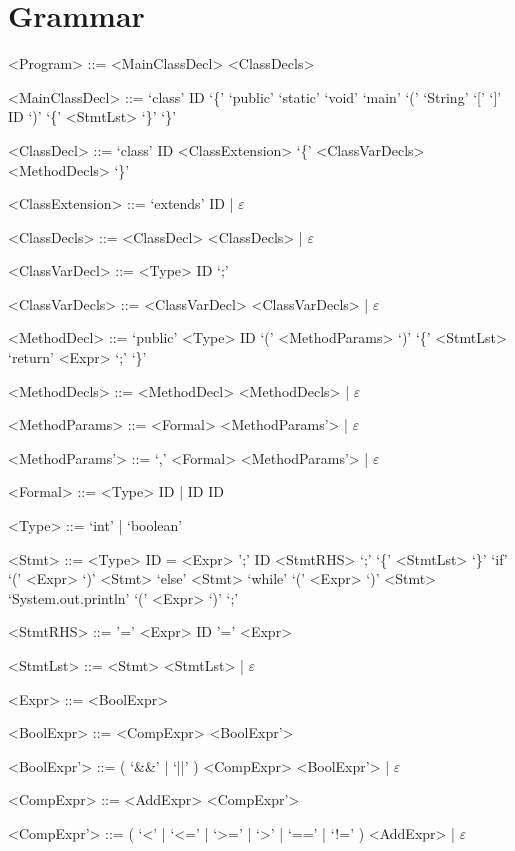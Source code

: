 \documentclass{report}
\begin{document}
\setlength{\grammarparsep}{4pt} %
\setlength{\grammarindent}{12em} %

\section*{Grammar}
\begin{grammar}

<Program> ::= <MainClassDecl> <ClassDecls>

<MainClassDecl> ::= `class' ID `\{' `public' `static' `void' `main' `(' `String' `[' `]' ID `)' `\{' <StmtLst> `\}' `\}'

<ClassDecl> ::= `class' ID <ClassExtension> `\{' <ClassVarDecls> <MethodDecls> `\}'

<ClassExtension> ::= `extends' ID | $\varepsilon$

<ClassDecls> ::= <ClassDecl> <ClassDecls> | $\varepsilon$

<ClassVarDecl> ::= <Type> ID `;'

<ClassVarDecls> ::= <ClassVarDecl> <ClassVarDecls> | $\varepsilon$

<MethodDecl> ::= `public' <Type> ID `(' <MethodParams> `)' `\{' <StmtLst> `return' <Expr> `;' `\}'

<MethodDecls> ::= <MethodDecl> <MethodDecls> | $\varepsilon$

<MethodParams> ::= <Formal> <MethodParams'> | $\varepsilon$

<MethodParams'> ::= `,' <Formal> <MethodParams'> | $\varepsilon$

<Formal> ::= <Type> ID | ID ID

<Type> ::= `int' | `boolean'

<Stmt> ::= <Type> ID = <Expr> ';'
\alt ID <StmtRHS> `;'
\alt `\{' <StmtLst> `\}'
\alt `if' `(' <Expr> `)' <Stmt> `else' <Stmt>
\alt `while' `(' <Expr> `)' <Stmt>
\alt `System.out.println' `(' <Expr> `)' `;'

<StmtRHS> ::= '=' <Expr>
\alt ID '=' <Expr>

<StmtLst> ::= <Stmt> <StmtLst> | $\varepsilon$

<Expr> ::= <BoolExpr>

<BoolExpr> ::= <CompExpr> <BoolExpr'>

<BoolExpr'> ::= ( `&&' | `||' ) <CompExpr> <BoolExpr'> | $\varepsilon$

<CompExpr> ::= <AddExpr> <CompExpr'>

<CompExpr'> ::= ( `<' | `<=' | `>=' | `>' | `==' | `!=' ) <AddExpr> | $\varepsilon$


\end{grammar}
\end{document}
